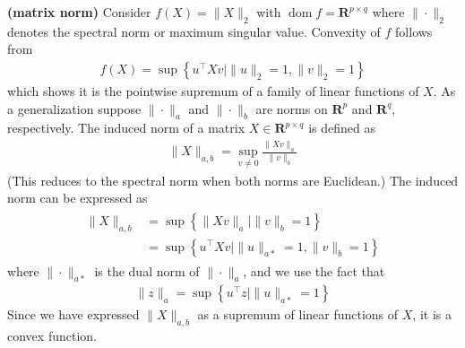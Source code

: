 \documentclass{article}
\newcommand{\bfs}[1]{\textbf{({#1}) }}
\newcommand{\dom}{\operatorname{dom}}
\begin{document}
\begin{exma}{\bfs{matrix norm}}
Consider $f(X)=\|X\|_{2}$ with $\dom  f=\mathbf{R}^{p \times q}$ where $\|\cdot\|_{2}$ denotes the spectral norm or maximum singular value. Convexity of $f$ follows from
\begin{align*}
f(X)=\sup \left\{u^{\top} X v \mid\|u\|_{2}=1,\|v\|_{2}=1\right\}
\end{align*}
which shows it is the pointwise supremum of a family of linear functions of $X$.
As a generalization suppose $\|\cdot\|_{a}$ and $\|\cdot\|_{b}$ are norms on $\mathbf{R}^{p}$ and $\mathbf{R}^{q}$, respectively. The induced norm of a matrix $X \in \mathbf{R}^{p \times q}$ is defined as
\begin{align*}
\|X\|_{a, b}=\sup _{v \neq 0} \frac{\|X v\|_{a}}{\|v\|_{b}}
\end{align*}
(This reduces to the spectral norm when both norms are Euclidean.) The induced norm can be expressed as
\begin{align*}
\begin{aligned}
\|X\|_{a, b} &=\sup \left\{\|X v\|_{a} \mid\|v\|_{b}=1\right\} \\
&=\sup \left\{u^{\top} X v \mid\|u\|_{a *}=1,\|v\|_{b}=1\right\}
\end{aligned}
\end{align*}
where $\|\cdot\|_{a *}$ is the dual norm of $\|\cdot\|_{a}$, and we use the fact that
\begin{align*}
\|z\|_{a}=\sup \left\{u^{\top} z \mid\|u\|_{a *}=1\right\}
\end{align*}
Since we have expressed $\|X\|_{a, b}$ as a supremum of linear functions of $X$, it is a convex function.
\end{exma} 
\end{document}
